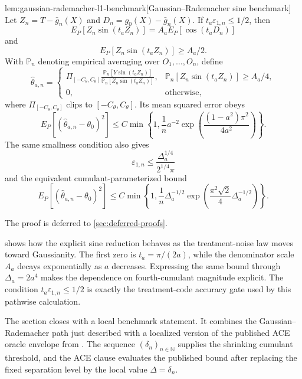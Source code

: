 \documentclass[11pt]{article}
\begin{document}
\begin{lemmav}{lem:gaussian-rademacher-l1-benchmark}[Gaussian--Rademacher sine benchmark]
Let \(Z_n=T-\bar g_n(X)\) and \(D_n=g_0(X)-\bar g_n(X)\).  If \(t_a\varepsilon_{1,n}\le 1/2\), then
\[
E_P[Z_n\sin(t_aZ_n)]
=A_aE_P[\cos(t_aD_n)]
\]
and
\[
E_P[Z_n\sin(t_aZ_n)]\ge A_a/2.
\]
With \(\mathbb P_n\) denoting empirical averaging over \(O_1,\ldots,O_n\), define
\[
 \widehat\theta_{a,n}
 =
 \begin{cases}
 \displaystyle
 \Pi_{[-C_{\theta},C_{\theta}]}
 \frac{\mathbb P_n[Y\sin(t_aZ_n)]}
      {\mathbb P_n[Z_n\sin(t_aZ_n)]},
 &\displaystyle \mathbb P_n[Z_n\sin(t_aZ_n)]\ge A_a/4,\\[3mm]
 0,&\text{otherwise},
 \end{cases}
\]
where \(\Pi_{[-C_{\theta},C_{\theta}]}\) clips to \([-C_{\theta},C_{\theta}]\).  Its mean squared error obeys
\[
 E_P[(\widehat\theta_{a,n}-\theta_0)^2]
 \le
 C\min\!\left\{1,\frac1n a^{-2}
 \exp\!\left(\frac{(1-a^2)\pi^2}{4a^2}\right)\right\}.
\]
The same smallness condition also gives
\[
\varepsilon_{1,n}\le \frac{\Delta_a^{1/4}}{2^{1/4}\pi}
\]
and the equivalent cumulant-parameterized bound
\[
 E_P[(\widehat\theta_{a,n}-\theta_0)^2]
 \le
 C\min\!\left\{1,\frac1n\Delta_a^{-1/2}
 \exp\!\left(\frac{\pi^2\sqrt2}{4}\Delta_a^{-1/2}\right)\right\}.
\]
\end{lemmav}

The proof is deferred to \cref{sec:deferred-proofs}.

 shows how the explicit sine reduction behaves as the treatment-noise law moves toward Gaussianity. The first zero is \(t_a=\pi/(2a)\), while the denominator scale \(A_a\) decays exponentially as \(a\) decreases. Expressing the same bound through \(\Delta_a=2a^4\) makes the dependence on fourth-cumulant magnitude explicit. The condition \(t_a\varepsilon_{1,n}\le1/2\) is exactly the treatment-code accuracy gate used by this pathwise calculation.

The section closes with a local benchmark statement. It combines the Gaussian--Rademacher path just described with a localized version of the published ACE oracle envelope from \citet{JinMackeySyrgkanis2025}. The sequence \((\delta_n)_{n\in\mathbb N}\) supplies the shrinking cumulant threshold, and the ACE clause evaluates the published bound after replacing the fixed separation level by the local value \(\Delta=\delta_n\).
\end{document}
